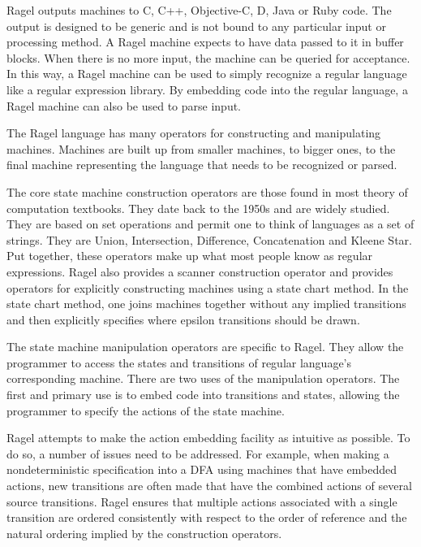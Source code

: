 \documentclass[letterpaper,11pt,oneside]{book}
\begin{document}
Ragel outputs machines to C, C++, Objective-C, D, Java or Ruby code. The output is
designed to be generic and is not bound to any particular input or processing
method. A Ragel machine expects to have data passed to it in buffer blocks.
When there is no more input, the machine can be queried for acceptance.  In
this way, a Ragel machine can be used to simply recognize a regular language
like a regular expression library. By embedding code into the regular language,
a Ragel machine can also be used to parse input.

The Ragel language has many operators for constructing and manipulating
machines. Machines are built up from smaller machines, to bigger ones, to the
final machine representing the language that needs to be recognized or parsed.

The core state machine construction operators are those found in most theory
of computation textbooks. They date back to the 1950s and are widely studied.
They are based on set operations and permit one to think of languages as a set
of strings. They are Union, Intersection, Difference, Concatenation and Kleene
Star. Put together, these operators make up what most people know as regular
expressions. Ragel also provides a scanner construction operator 
and provides operators for explicitly constructing machines
using a state chart method. In the state chart method, one joins machines
together without any implied transitions and then explicitly specifies where
epsilon transitions should be drawn.

The state machine manipulation operators are specific to Ragel. They allow the
programmer to access the states and transitions of regular language's
corresponding machine. There are two uses of the manipulation operators. The
first and primary use is to embed code into transitions and states, allowing
the programmer to specify the actions of the state machine.

Ragel attempts to make the action embedding facility as intuitive as possible.
To do so, a number of issues need to be addressed.  For example, when making a
nondeterministic specification into a DFA using machines that have embedded
actions, new transitions are often made that have the combined actions of
several source transitions. Ragel ensures that multiple actions associated with
a single transition are ordered consistently with respect to the order of
reference and the natural ordering implied by the construction operators.
\end{document}
